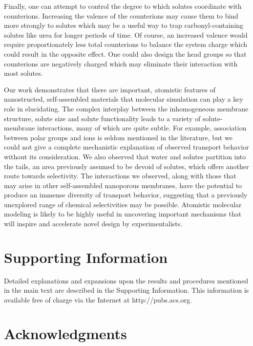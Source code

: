 \documentclass[journal=jpcbfk,manuscript=article]{achemso}
\begin{document}
  Finally, one can attempt to control the degree to which solutes coordinate
  with counterions. Increasing the valence of the counterions may cause them
  to bind more strongly to solutes which may be a useful way to trap 
  carbonyl-containing solutes like urea for longer periods of time. Of course,
  an increased valence would require proportionately less total counterions
  to balance the system charge which could result in the opposite effect. One
  could also design the head groups so that counterions are negatively charged
  which may eliminate their interaction with most solutes.
  
  Our work demonstrates that there are important, atomistic features of nanostructed, 
  self-assembled materials that molecular simulation can play a key role in elucidating.
  The complex interplay between the inhomogeneous membrane structure, solute size and 
  solute functionality leads to a variety of solute-membrane interactions, many of which
  are quite subtle. For example, association between polar groups and ions is seldom 
  mentioned in the literature, but we could not give a complete mechanistic explanation
  of observed transport behavior without its consideration. We also observed that water
  and solutes partition into the tails, an area previously assumed to be devoid of solutes,
  which offers another route towards selectivity. The interactions we observed, along 
  with those that may arise in other self-assembled nanoporous membranes, have the 
  potential to produce an immense diversity of transport behavior, suggesting that a 
  previously unexplored range of chemical selectivities may be possible. Atomistic 
  molecular modeling is likely to be highly useful in uncovering important mechanisms
  that will inspire and accelerate novel design by experimentalists.

  \section*{Supporting Information}

  Detailed explanations and expansions upon the results and procedures mentioned in
  the main text are described in the Supporting Information. This information is
  available free of charge via the Internet at http://pubs.acs.org.

  \section*{Acknowledgments}
\end{document}
